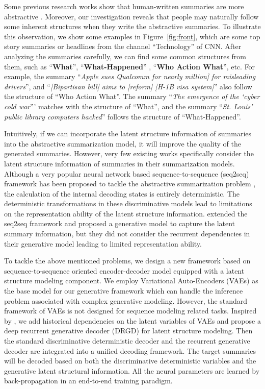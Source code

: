 \documentclass[11pt,letterpaper]{article}
\begin{document}
Some previous research works show that human-written summaries are more abstractive \cite{jing2000cut}.
Moreover, our investigation reveals that people may naturally follow some inherent structures when they write the abstractive summaries.
To illustrate this observation, we show some examples in Figure~\ref{fig:front}, which are some top story summaries or headlines from the channel ``Technology'' of CNN. After analyzing the summaries carefully, we can find some common structures from them, such as ``\textbf{What}'', ``\textbf{What-Happened}'' , ``\textbf{Who Action What}'', etc.
For example, the summary ``\textit{Apple sues Qualcomm for nearly  million] for misleading drivers}'', and ``\textit{[Bipartisan bill] aims to [reform] [H-1B visa system]}'' also follow the structure of ``Who Action What''.
The summary ``\textit{The emergence of the `cyber cold war}''' matches with the structure of ``What'', and the summary ``\textit{St. Louis' public library computers hacked}'' follows the structure of ``What-Happened''.


Intuitively, if we can incorporate the latent structure information of summaries into the abstractive summarization model, it will improve the quality of the generated summaries.
However, very few existing works specifically consider the latent structure information of summaries in their summarization models.
Although a very popular neural network based sequence-to-sequence (seq2seq) framework has been proposed to tackle the abstractive summarization problem \cite{lopyrev2015generating,rush2015neural,nallapati2016abstractive}, the calculation of the internal decoding states is entirely deterministic.
The deterministic transformations in these discriminative models lead to limitations on the representation ability of the latent structure information.
\citet{miao2016language} extended the seq2seq framework and proposed a generative model to capture the latent summary information, but they did not consider the recurrent dependencies in their generative model leading to limited representation ability.

To tackle the above mentioned problems, we design a new framework based on sequence-to-sequence oriented encoder-decoder model equipped with a latent structure modeling component.  
We employ Variational Auto-Encoders (VAEs) \cite{kingma2013auto,rezende2014stochastic} as the base model for our generative framework which can handle the inference problem associated with complex generative modeling.
However, the standard framework of VAEs is not designed for sequence modeling related tasks.
Inspired by \cite{chung2015recurrent}, we add historical dependencies on the latent variables of VAEs and propose a deep recurrent generative decoder (DRGD) for latent structure modeling.
Then the standard discriminative deterministic decoder and the recurrent generative decoder are integrated into a unified decoding framework.
The target summaries will be decoded based on both the discriminative deterministic variables and the generative latent structural information.
All the neural parameters are learned by back-propagation in an end-to-end training paradigm.
\end{document}
